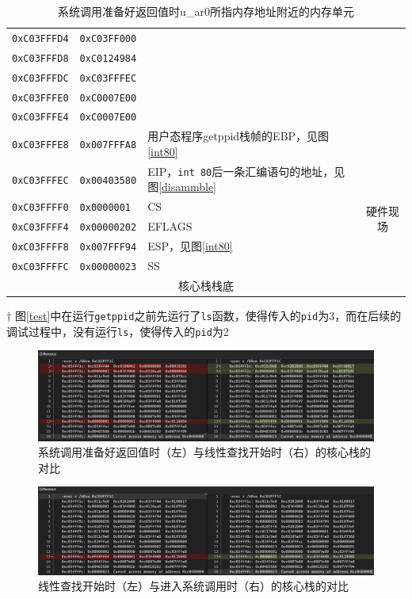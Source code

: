 \begin{table}[htbp]
\begin{threeparttable}[b]
\begin{tabular}{cllc}
           \texttt{0xC03FFFD4}&\texttt{0xC03FF000}&    \\
           \texttt{0xC03FFFD8}&\texttt{0xC0124984}&     \\
           \texttt{0xC03FFFDC}&\texttt{0xC03FFFEC}&     \\
           \texttt{0xC03FFFE0}&\texttt{0xC0007E00}&     \\
           \texttt{0xC03FFFE4}&\texttt{0xC0007E00}&     \\
           \texttt{0xC03FFFE8}&\texttt{0x007FFFA8}&用户态程序getppid栈帧的EBP，见图\ref{int80}\\\midrule
           \texttt{0xC03FFFEC}&\texttt{0x00403580}&EIP，\texttt{int 80}后一条汇编语句的地址，见图\ref{disammble}  &\multirow{5}{*}{硬件现场}\\
            \texttt{0xC03FFFF0}&\texttt{0x0000001}&CS   \\
            \texttt{0xC03FFFF4}&\texttt{0x00000202}&EFLAGS\\
            \texttt{0xC03FFFF8}&\texttt{0x007FFF94}&ESP，见图\ref{int80}  \\
            \texttt{0xC03FFFFC}&\texttt{0x00000023}&SS   \\
            \multicolumn{4}{c}{核心栈栈底}\\
        \bottomrule
    \end{tabular}
    \begin{tablenotes}
    \footnotesize
    \item[$\dagger$]{图\ref{test}中在运行\texttt{getppid}之前先运行了\texttt{ls}函数，使得传入的\texttt{pid}为3，而在后续的调试过程中，没有运行\texttt{ls}，使得传入的\texttt{pid}为2}
    \end{tablenotes}
    \end{threeparttable}
    \caption{系统调用准备好返回值时u\_ar0所指内存地址附近的内存单元}\label{table2}
    \end{table}
    \begin{figure}[!htbp]
        \centering
        \includegraphics[width=\textwidth]{images/3vs2.png}
        \caption{系统调用准备好返回值时（左）与线性查找开始时（右）的核心栈的对比}\label{3vs2}
    \end{figure}
    
 \begin{figure}[!htbp]
        \centering
        \includegraphics[width=\textwidth]{images/2vs1.png}
        \caption{线性查找开始时（左）与进入系统调用时（右）的核心栈的对比}\label{2vs1}
    \end{figure}
    